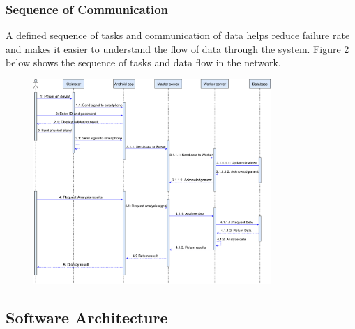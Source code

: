 \documentclass[10pt,journal,compsoc]{IEEEtran}
\begin{document}
\subsubsection{Sequence of Communication}
A defined sequence of tasks and communication of data helps reduce failure rate and makes it easier to understand the flow of data through the system. Figure 2 below shows the sequence of tasks and data flow in the network.
\begin{figure}[h]
\centering
\includegraphics[width=9cm]{sequence}
\end{figure}

\subsection{Software Architecture}
\end{document}
